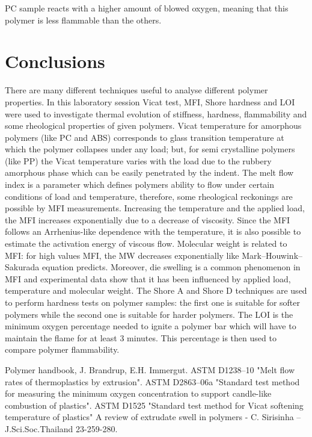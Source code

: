 \documentclass[a4paper, 11pt]{article}
\begin{document}
PC sample reacts with a higher amount of blowed oxygen, meaning that this polymer is less flammable than the others.
\newpage 
\section{Conclusions}

There are many different techniques useful to analyse different polymer properties. In this laboratory session Vicat test, MFI, Shore hardness and LOI were used to investigate thermal evolution of stiffness, hardness, flammability and some rheological properties of given polymers.
Vicat temperature for amorphous polymers (like PC and ABS) corresponds to glass transition temperature at which the polymer collapses under any load; but, for semi crystalline polymers (like PP) the Vicat temperature varies with the load due to the rubbery amorphous phase which can be easily penetrated by the indent.
The melt flow index is a parameter which defines polymers ability to flow under certain conditions of load and temperature, therefore, some rheological reckonings are possible by MFI measurements. Increasing the temperature and the applied load, the MFI increases exponentially due to a decrease of viscosity. Since the MFI follows an Arrhenius-like dependence with the temperature, it is also possible to estimate the activation energy of viscous flow. Molecular weight is related to MFI: for high values MFI, the MW decreases exponentially like Mark–Houwink–Sakurada equation predicts. Moreover, die swelling is a common phenomenon in MFI and experimental data show that it has been influenced by applied load, temperature and molecular weight.
The Shore A and Shore D techniques are used to perform hardness tests on polymer samples: the first one is suitable for softer polymers while the second one is suitable for harder polymers.
The LOI is the minimum oxygen percentage needed to ignite a polymer bar which will have to maintain the flame for at least 3 minutes. This percentage is then used to compare polymer flammability.

\newpage

\thispagestyle{empty}

\begin{thebibliography}{1}

 Polymer handbook, J. Brandrup, E.H. Immergut.
 ASTM D1238–10 "Melt flow rates of thermoplastics by extrusion". 
 ASTM D2863–06a "Standard test method for measuring the minimum oxygen concentration to support candle-like combustion of plastics".
 ASTM D1525 "Standard test method for Vicat softening temperature of plastics"
 A review of extrudate swell in polymers - C. Sirisinha – J.Sci.Soc.Thailand 23-259-280.

\end{thebibliography}
\end{document}
